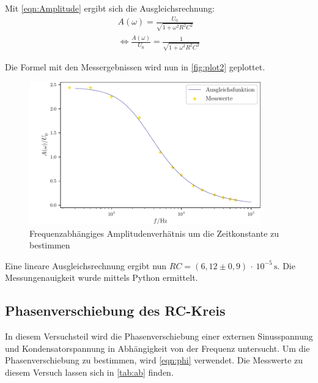 Mit \autoref{eqn:Amplitude} ergibt sich die Ausgleichsrechnung:
\begin{align*}
  A(\omega) = \frac{U_0}{\sqrt{1+\omega^2 R^2 C^2}} \\
  \Leftrightarrow \frac{A(\omega)}{U_0} = \frac{1}{\sqrt{1+\omega^2 R^2 C^2}}
\end{align*}

Die Formel mit den Messergebnissen wird nun in \autoref{fig:plot2} geplottet.

\begin{figure}
  \centering
  \includegraphics[width=100mm,scale=0.5]{build/plot2.pdf}
  \caption{Frequenzabhängiges Amplitudenverhätnis um die Zeitkonstante zu bestimmen}
  \label{fig:plot2}
\end{figure}

Eine lineare Ausgleichsrechnung ergibt nun $RC = (6,12 \pm 0,9) \, \cdot \, 10^{-5} \, \unit{\second}$. Die Messungenauigkeit wurde mittels
Python ermittelt.

\subsection{Phasenverschiebung des RC-Kreis}

In diesem Versuchsteil wird die Phasenverschiebung einer externen Sinusspannung und Kondensatorspannung in Abhängigkeit von der Frequenz untersucht. 
Um die Phasenverschiebung zu bestimmen, wird \autoref{eqn:phi} verwendet. Die Messwerte zu diesem Versuch lassen sich in \autoref{tab:ab} finden.

